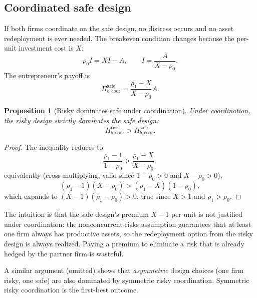 \documentclass[11pt,a4paper,oneside]{book}
\theoremstyle{plain}
\newtheorem{proposition}[theorem]{Proposition}
\theoremstyle{definition}
\theoremstyle{remark}
\numberwithin{equation}{chapter}
\begin{document}
\subsection{Coordinated safe design}

If both firms coordinate on the safe design, no distress occurs and no asset redeployment is ever needed.
The breakeven condition changes because the per-unit investment cost is $X$:
\begin{equation*}
  \rho_0 I = X I - A,
  \qquad I = \frac{A}{X - \rho_0}.
\end{equation*}
The entrepreneur's payoff is
\begin{equation}\label{eq:ma-coord-safe}
  \Pi_{b, \text{coor}}^{\text{safe}} = \frac{\rho_1 - X}{X - \rho_0} A.
\end{equation}

\begin{proposition}[Risky dominates safe under coordination]\label{prop:ma-coord-comparison}
Under coordination, the risky design strictly dominates the safe design:
\begin{equation*}
  \Pi_{b, \text{coor}}^{\text{risk}} > \Pi_{b, \text{coor}}^{\text{safe}}.
\end{equation*}
\end{proposition}

\begin{proof}
The inequality reduces to
\begin{equation*}
  \frac{\rho_1 - 1}{1 - \rho_0} > \frac{\rho_1 - X}{X - \rho_0},
\end{equation*}
equivalently (cross-multiplying, valid since $1 - \rho_0 > 0$ and $X - \rho_0 > 0$),
\begin{equation*}
  (\rho_1 - 1)(X - \rho_0) > (\rho_1 - X)(1 - \rho_0),
\end{equation*}
which expands to $(X - 1)(\rho_1 - \rho_0) > 0$, true since $X > 1$ and $\rho_1 > \rho_0$.
\end{proof}

The intuition is that the safe design's premium $X - 1$ per unit is not justified under coordination: the nonconcurrent-risks assumption guarantees that at least one firm always has productive assets, so the redeployment option from the risky design is always realized.
Paying a premium to eliminate a risk that is already hedged by the partner firm is wasteful.

A similar argument (omitted) shows that \emph{asymmetric} design choices (one firm risky, one safe) are also dominated by symmetric risky coordination.
Symmetric risky coordination is the first-best outcome.
\end{document}
